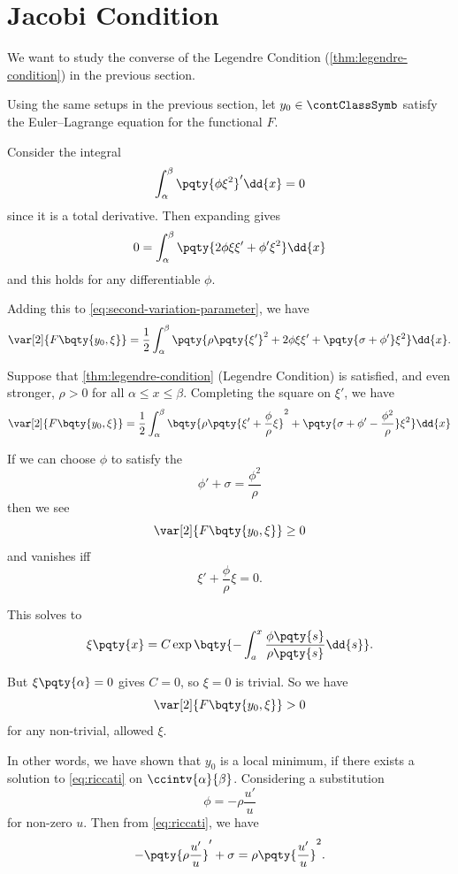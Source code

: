 \section{Jacobi Condition}

We want to study the converse of the Legendre Condition (\autoref{thm:legendre-condition}) in the previous section.

Using the same setups in the previous section, let \(y_0 \in \contClassSymb\) satisfy the Euler--Lagrange equation for the functional \(F\).

Consider the integral
\[
    \int_{\alpha}^{\beta} \pqty{\phi \xi^2}' \dd{x} = 0
\]
since it is a total derivative. Then expanding gives
\[
    0 = \int_{\alpha}^{\beta} \pqty{2 \phi \xi \xi' + \phi' \xi^2} \dd{x}
\]
and this holds for any differentiable \(\phi\).

Adding this to \eqref{eq:second-variation-parameter}, we have
\[
    \var[2]{F\bqty{y_0, \xi}} = \frac{1}{2} \int_{\alpha}^{\beta} \pqty{\rho \pqty{\xi'}^2 + 2 \phi \xi \xi' + \pqty{\sigma + \phi'} \xi^2} \dd{x}.
\]

Suppose that \autoref{thm:legendre-condition} (Legendre Condition) is satisfied, and even stronger, \(\rho > 0\) for all \(\alpha \leq x \leq \beta\). Completing the square on \(\xi'\), we have
\[
    \var[2]{F\bqty{y_0, \xi}} = \frac{1}{2} \int_{\alpha}^{\beta} \bqty{\rho \pqty{\xi ' + \frac{\phi}{\rho} \xi}^2 + \pqty{\sigma + \phi ' - \frac{\phi^2}{\rho}} \xi^2} \dd{x}
\]

If we can choose \(\phi\) to satisfy the 
\begin{equation}
    \label{eq:riccati}%
    \phi' + \sigma = \frac{\phi^2}{\rho}
\end{equation}
then we see
\[
    \var[2]{F\bqty{y_0, \xi}} \geq 0
\]
and vanishes iff
\[
    \xi' + \frac{\phi}{\rho} \xi = 0.
\]

This solves to
\[
    \xi \pqty{x} = C \exp \bqty{- \int_{a}^{x} \frac{\phi\pqty{s}}{\rho\pqty{s}} \dd{s}}.
\]

But \(\xi\pqty{\alpha} = 0\) gives \(C = 0\), so \(\xi = 0\) is trivial. So we have
\[
    \var[2]{F\bqty{y_0, \xi}} > 0
\]
for any non-trivial, allowed \(\xi\).

In other words, we have shown that \(y_0\) is a local minimum, if there exists a solution to \eqref{eq:riccati} on \(\ccintv{\alpha}{\beta}\). Considering a substitution
\[
    \phi = - \rho \frac{u'}{u}
\]
for non-zero \(u\). Then from \eqref{eq:riccati}, we have
\[
    - \pqty{\rho \frac{u'}{u}}' + \sigma = \rho \pqty{\frac{u'}{u}}^2.
\]

